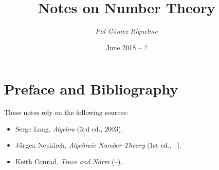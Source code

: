 \documentclass[12pt,oneside]{article}
\begin{document}
\title{Notes on Number Theory}
\author{\small\textit{Pol Gómez Riquelme}}
\date{June 2018 -- ?}
\maketitle

\tableofcontents
\pagebreak

\section*{Preface and Bibliography}

These notes rely on the following sources:
\begin{itemize}
	\item Serge Lang, \emph{Algebra} (3rd ed., 2003).
	\item Jürgen Neukirch, \emph{Algebraic Number Theory} (1st ed., --).
	\item Keith Conrad, \emph{Trace and Norm} (--).
\end{itemize}

\pagebreak




\end{document}
